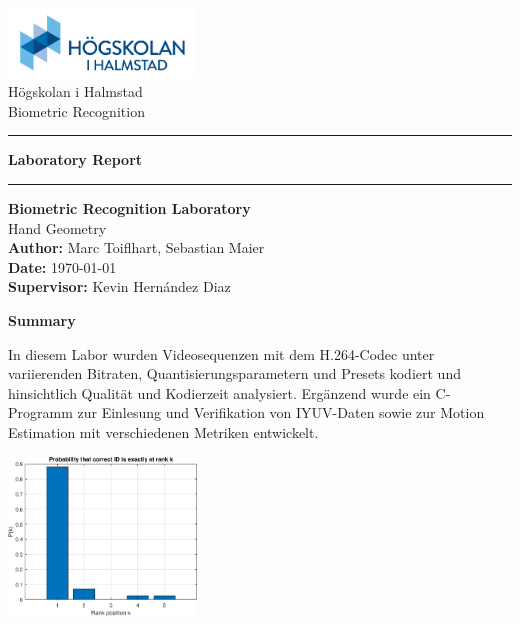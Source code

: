 \documentclass[a4paper,12pt]{article}
\begin{document}
\begin{titlepage}
    \centering
    \includegraphics[width=5cm]{Resources/hogskolan-halmstad-logo.png} \\[0.5cm] %
    Högskolan i Halmstad \\[0.2cm]
    Biometric Recognition \\[1.5cm]
    
    \hrule
    \vspace{0.4cm} %
    {\LARGE \textbf{Laboratory Report}}
    \vspace{0.4cm}
    \hrule
    \vspace{1.5cm} %

    {\Large \textbf{Biometric Recognition Laboratory}} \\[0.2cm]
    {\Large Hand Geometry} \\[1cm]
    
    \textbf{Author:} Marc Toiflhart, Sebastian Maier \\[0.2cm]
    \textbf{Date:} \today \\[0.2cm]
    \textbf{Supervisor:} Kevin Hernández Diaz

    \vfill
\end{titlepage}
\newpage

\begin{center}
    \textbf{Summary}
\end{center}
In diesem Labor wurden Videosequenzen mit dem H.264-Codec unter variierenden Bitraten, Quantisierungsparametern und Presets kodiert und hinsichtlich Qualität und Kodierzeit analysiert. Ergänzend wurde ein C-Programm zur Einlesung und Verifikation von IYUV-Daten sowie zur Motion Estimation mit verschiedenen Metriken entwickelt.

\vspace{0.4cm} %
\centering
\includegraphics[width=5cm]{Resources/rank_plot.eps} \\[0.5cm]
\end{document}

